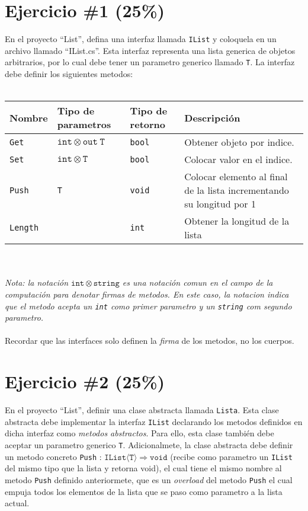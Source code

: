 \documentclass{article}
\begin{document}
\section*{Ejercicio \#1 (25\%)}

En el proyecto ``List'', defina una interfaz llamada \texttt{IList} y coloquela en
un archivo llamado ``IList.cs''. Esta interfaz representa una lista generica de objetos
arbitrarios, por lo cual debe tener un parametro generico llamado \texttt{T}. La interfaz
debe definir los siguientes metodos:
\\\\
\begin{tabular}{|l|l|l|p{7cm}|}
        \hline
        {\bf Nombre} & {\bf Tipo de parametros} & {\bf Tipo de retorno} & {\bf Descripci\'on} \\
        \hline
        \texttt{Get} & $\mathtt{int}\otimes\mathtt{out}\ \mathtt{T}$ & \texttt{bool} & Obtener objeto por indice. \\
        \hline
        \texttt{Set} & $\mathtt{int}\otimes\mathtt{T}$ & \texttt{bool} & Colocar valor en el indice. \\
        \hline
        \texttt{Push} & \texttt{T} & \texttt{void} & Colocar elemento al final de la lista incrementando su longitud por 1 \\
        \hline
        \texttt{Length} & & \texttt{int} & Obtener la longitud de la lista \\
        \hline
\end{tabular}
\\\\
\emph{Nota: la notaci\'on $\mathtt{int}\otimes\mathtt{string}$ es una notaci\'on comun en el campo
de la computaci\'on para denotar firmas de metodos. En este caso, la notacion indica que el metodo
acepta un \texttt{int} como primer parametro y un \texttt{string} com segundo parametro.}
\\\\
Recordar que las interfaces solo definen la \emph{firma} de los metodos, no los
cuerpos.
\section*{Ejercicio \#2 (25\%)}
En el proyecto ``List'', definir una clase abstracta llamada \texttt{Lista}. Esta clase abstracta debe
implementar la interfaz \texttt{IList} declarando los metodos definidos en dicha
interfaz como \emph{metodos abstractos}. Para ello, esta clase tambi\'en debe
aceptar un parametro generico \texttt{T}. Adicionalmete, la clase abstracta debe
definir un metodo concreto \texttt{Push} : $\mathtt{IList\langle T\rangle}
\Rightarrow\mathtt{void}$ (recibe como parametro un \texttt{IList} del mismo tipo
que la lista y retorna void), el cual tiene el mismo nombre al metodo \texttt{Push}
definido anteriormete, que es un \emph{overload} del metodo \texttt{Push} el cual
empuja todos los elementos de la lista que se paso como parametro a la lista
actual.
\end{document}
